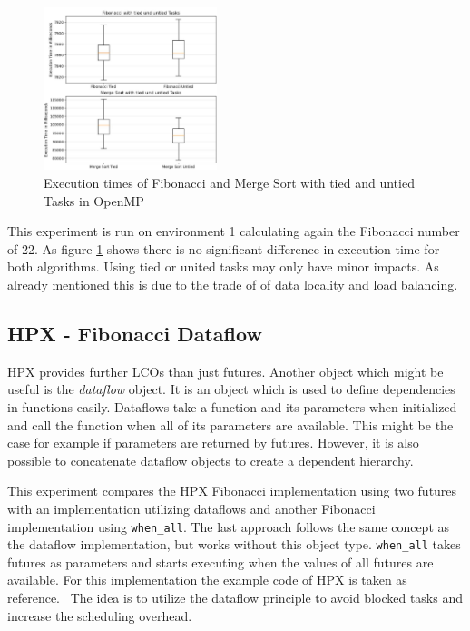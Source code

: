 \begin{figure}[h]
	\centering
	\includegraphics[width=0.45\textwidth]{figures/tied.JPG}
	\caption{Execution times of Fibonacci and Merge Sort with tied and untied Tasks in OpenMP}
	\label{fig:tied}
\end{figure}

  This experiment is run on environment 1 calculating again the Fibonacci number of 22.
  As figure \ref{fig:tied} shows there is no significant difference in execution time for both algorithms.
  Using tied or united tasks may only have minor impacts.
  As already mentioned this is due to the trade of of data locality and load balancing. 
  
\subsection{HPX - Fibonacci Dataflow}
HPX provides further LCOs than just futures.
Another object which might be useful is the \textit{dataflow} object.
It is an object which is used to define dependencies in functions easily.
Dataflows take a function and its parameters when initialized and call the function when all of its parameters are available. 
This might be the case for example if parameters are returned by futures.
However, it is also possible to concatenate dataflow objects to create a dependent hierarchy.~\cite{TheSTEARGroup.2020}

This experiment compares the HPX Fibonacci implementation using two futures with an implementation utilizing dataflows and another Fibonacci implementation using \texttt{when\_all}.
The last approach follows the same concept as the dataflow implementation, but works without this object type.
\texttt{when\_all} takes futures as parameters and starts executing when the values of all futures are available.
For this implementation the example code of HPX is taken as reference.~\cite{HPXGitHub.2020}
The idea is to utilize the dataflow principle to avoid blocked tasks and increase the scheduling overhead.

